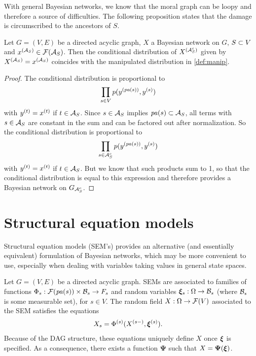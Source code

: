 With general Bayesian networks, we know that the moral graph can be
loopy and therefore a source of  difficulties. The following
proposition states that the damage is circumscribed to the ancestors of
$S$. 

\begin{proposition}
\label{prop:inf.cond}
Let $G=(V,E)$ be a directed acyclic graph, $X$ a Bayesian network on
$G$, $S\subset V$ and $x^{({\mathcal A}_S)}\in {\mathcal F}({\mathcal A}_S)$. Then the conditional
distribution of $X^{({\mathcal A}_S^c)}$ given by $X^{({\mathcal A}_S)} = x^{({\mathcal A}_S)}$
coincides with the manipulated distribution in 
\cref{def:manip}.
\end{proposition}
\begin{proof} 
The conditional distribution is proportional to 
$$
\prod_{s\in V} p(y^{({\mathit{pa}(s)})}, y^{(s)})
$$
with $y^{(t)} = x^{(t)}$ if $t\in {\mathcal A}_S$. Since $s\in{\mathcal A}_S$ implies ${\mathit{pa}(s)}\subset
{\mathcal A}_S$, all terms with $s\in {\mathcal A}_S$ are constant in the sum and can be
factored out after normalization. So the conditional distribution is
proportional to 
$$
\prod_{s\in {\mathcal A}_S^c} p(y^{({\mathit{pa}(s)})}, y^{(s)})
$$
with $y^{(t)} = x^{(t)}$ if $t\in {\mathcal A}_S$. But we know that such products sum
to 1, so that the conditional distribution is equal to this expression
and therefore provides a Bayesian network on $G_{{\mathcal A}_S^c}$.
\end{proof}

\section{Structural equation models}
\label{sec:sem}

Structural equation models (SEM's) provides an alternative (and essentially equivalent) formulation of Bayesian networks, which may be more convenient to use, especially when dealing with variables taking values in general state spaces.

Let $G=(V, E)$ be a directed acyclic graph.  SEMs are associated to families of functions $\Phi_s: {\mathcal F}({\mathit{pa}(s)}) \times {\mathcal B}_s\to F_s$ and random variables ${\bm{\xi}}_s: \Omega \to {\mathcal B}_s$ (where ${\mathcal B}_s$ is some measurable set), for $s\in V$. The random field $X: \Omega \to {\mathcal F}(V)$ associated to the SEM satisfies the equations
\begin{equation}
\label{eq:sem}
X_s =\Phi^{(s)}(X^{(s-)}, {\bm{\xi}}^{(s)}).
\end{equation}
Because of the DAG structure, these equations uniquely define $X$ once ${\bm{\xi}}$ is specified. As a consequence, there exists a function $\boldsymbol\Psi$ such that $X = \bm \Psi({\bm{\xi}})$. 


